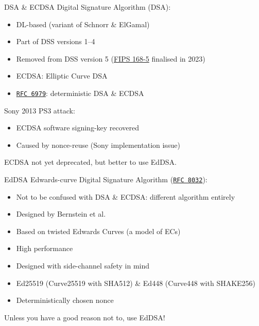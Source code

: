 \begin{frame}{DSA \& ECDSA}
  \pause
  Digital Signature Algorithm (DSA):
  \begin{itemize}[<+(1)->]
    \item DL-based (variant of Schnorr \& ElGamal)
    \item Part of DSS versions 1--4
    \item Removed from DSS version 5 (\href{https://csrc.nist.gov/pubs/fips/186-5/final}{FIPS 168-5} finalised in 2023)
    \item ECDSA: Elliptic Curve DSA
    \item \href{https://datatracker.ietf.org/doc/html/rfc6979}{\texttt{RFC 6979}}: deterministic DSA \& ECDSA
  \end{itemize}

  \pause
  Sony 2013 PS3 attack:
  \begin{itemize}
    \item ECDSA software signing-key recovered
    \item Caused by nonce-reuse (Sony implementation issue)
  \end{itemize}

  \pause
  ECDSA not yet deprecated, but better to use EdDSA.
\end{frame}

\begin{frame}{EdDSA}
  Edwards-curve Digital Signature Algorithm (\href{https://datatracker.ietf.org/doc/html/rfc8032}{\texttt{RFC 8032}}):
  \begin{itemize}[<+(1)->]
    \item Not to be confused with DSA \& ECDSA: different algorithm entirely
    \item Designed by \alert{Bernstein} et al.
    \item Based on twisted Edwards Curves (a model of ECs)
    \item High performance
    \item Designed with side-channel safety in mind
    \item Ed25519 (Curve25519 with SHA512) \& Ed448 (Curve448 with SHAKE256)
    \item Deterministically chosen nonce
  \end{itemize}

  \pause
  Unless you have a good reason not to, use EdDSA!
\end{frame}


